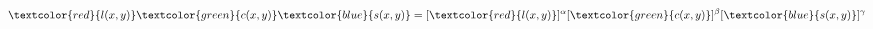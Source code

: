 \documentclass[preview]{standalone}
\begin{document}
\begin{align*}
\textcolor{red}{l(x,y)} \textcolor{green}{c(x,y)} \textcolor{blue}{s(x,y)}  = [ \textcolor{red}{l(x,y)} ]^{\alpha}[ \textcolor{green}{c(x,y)} ]^{\beta}[ \textcolor{blue}{s(x,y)} ]^{\gamma}
\end{align*}
\end{document}

